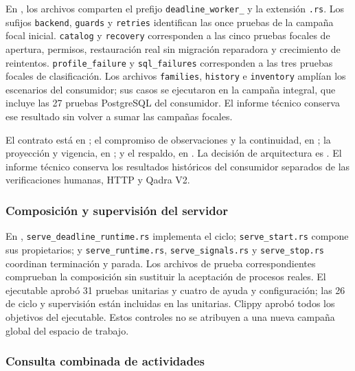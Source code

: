 En , los archivos comparten el prefijo \texttt{deadline\_worker\_} y la extensión \texttt{.rs}. Los sufijos \texttt{backend}, \texttt{guards} y \texttt{retries} identifican las once pruebas de la campaña focal inicial. \texttt{catalog} y \texttt{recovery} corresponden a las cinco pruebas focales de apertura, permisos, restauración real sin migración reparadora y crecimiento de reintentos. \texttt{profile\_failure} y \texttt{sql\_failures} corresponden a las tres pruebas focales de clasificación. Los archivos \texttt{families}, \texttt{history} e \texttt{inventory} amplían los escenarios del consumidor; sus casos se ejecutaron en la campaña integral, que incluye las 27 pruebas PostgreSQL del consumidor. El informe técnico conserva ese resultado sin volver a sumar las campañas focales.

El contrato está en ; el compromiso de observaciones y la continuidad, en ; la proyección y vigencia, en ; y el respaldo, en . La decisión de arquitectura es . El informe técnico conserva los resultados históricos del consumidor separados de las verificaciones humanas, HTTP y Qadra V2.
\par
\endgroup

\subsubsection{Composición y supervisión del servidor}

En , \texttt{serve\_deadline\_runtime.rs} implementa el ciclo; \texttt{serve\_start.rs} compone sus propietarios; y \texttt{serve\_runtime.rs}, \texttt{serve\_signals.rs} y \texttt{serve\_stop.rs} coordinan terminación y parada. Los archivos de prueba correspondientes comprueban la composición sin sustituir la aceptación de procesos reales. El ejecutable aprobó 31 pruebas unitarias y cuatro de ayuda y configuración; las 26 de ciclo y supervisión están incluidas en las unitarias. Clippy aprobó todos los objetivos del ejecutable. Estos controles no se atribuyen a una nueva campaña global del espacio de trabajo.

\subsubsection{Consulta combinada de actividades}

